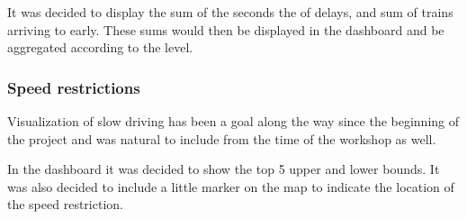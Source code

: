 It was decided to display the sum of the seconds the of delays, and sum of 
trains arriving to early. These sums would then be displayed in the dashboard 
and be aggregated according to the level.


\subsubsection{Speed restrictions} %
\label{ssub:speed_restrictions}
Visualization of slow driving has been a goal along the way since the beginning
of the project and was natural to include from the time of the workshop as 
well.

In the dashboard it was decided to show the top 5 upper and lower bounds.
It was also decided to include a little marker on the map to indicate the
location of the speed restriction.



